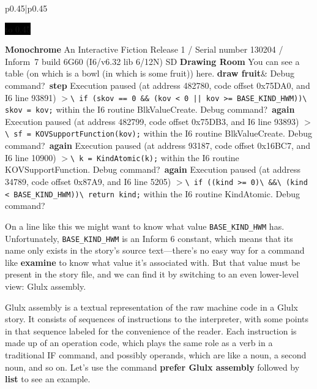 \documentclass{book}
\newcommand{\n}{\hspace*{\fill}\newline}
\newcommand{\terp}[2]{\begin{center}\begin{tabular}{p{0.45\textwidth}|p{0.45\textwidth}}\midrule #1&#2\\\midrule\end{tabular}\end{center}}
\newcommand{\glkheading}[1]{\textbf{#1}}
\newcommand{\glkinput}[1]{\textbf{#1}}
\newcommand{\glkstatusline}[2]{\centerline{\colorbox{black}{\hbox to 0.45\textwidth{\textcolor{white}{#1\hfil #2}}}}}
\newcommand{\storyprompt}{\raisebox{1.5pt}{\(>\)}}
\newcommand{\cursor}{\raisebox{-1.5pt}{\RectangleThin}}
\newcommand{\markedindent}{\(>\)}
\begin{document}
\terp{\glkstatusline{Drawing Room}{0/1}\n
  \glkheading{Monochrome}\n
  An Interactive Fiction\n
  Release 1 / Serial number 130204 / Inform~7 build 6G60 (I6/v6.32 lib 6/12N) SD\n
  \n
  \glkheading{Drawing Room}\n
  You can see a table (on which is a bowl (in which is some fruit)) here.\n
  \n
  \storyprompt\glkinput{draw fruit}}{%
  Debug command?\ \glkinput{step}\n
  \n
  Execution paused (at address 482780, code offset 0x75DA0, and I6 line 93891)\n
  \markedindent \lstinline{\ if (skov == 0 && (kov < 0 || kov >= BASE_KIND_HWM))}\lstinline{\ skov = kov;}\n
  within the I6 routine BlkValueCreate.\n
  \n
  Debug command?\ \glkinput{again}\n
  \n
  Execution paused (at address 482799, code offset 0x75DB3, and I6 line 93893)\n
  \markedindent \lstinline{\ sf = KOVSupportFunction(kov);}\n
  within the I6 routine BlkValueCreate.\n
  \n
  Debug command?\ \glkinput{again}\n
  \n
  Execution paused (at address 93187, code offset 0x16BC7, and I6 line 10900)\n
  \markedindent \lstinline{\ k = KindAtomic(k);}\n
  within the I6 routine KOVSupportFunction.\n
  \n
  Debug command?\ \glkinput{again}\n
  \n
  Execution paused (at address 34789, code offset 0x87A9, and I6 line 5205)\n
  \markedindent \lstinline{\ if ((kind >= 0)}\lstinline{\ &&}\lstinline{\ (kind < BASE_KIND_HWM))}\lstinline{\ return kind;}\n
  within the I6 routine KindAtomic.\n
  \n
  Debug command?\ \cursor}

On a line like this we might want to know what value \lstinline{BASE_KIND_HWM}
has.  Unfortunately, \lstinline{BASE_KIND_HWM} is an Inform 6 constant, which
means that its name only exists in the story's source text---there's no easy way
for a command like \glkinput{examine} to know what value it's associated with.
But that value must be present in the story file, and we can find it by
switching to an even lower-level view: Glulx assembly.

\label{glulx-format}
Glulx assembly is a textual representation of the raw machine code in a Glulx
story.  It consists of sequences of instructions to the interpreter, with some
points in that sequence labeled for the convenience of the reader.  Each
instruction is made up of an operation code, which plays the same role as a verb
in a traditional IF command, and possibly operands, which are like a noun, a
second noun, and so on.  Let's use the command \glkinput{prefer Glulx assembly}
followed by \glkinput{list} to see an example.
\end{document}
